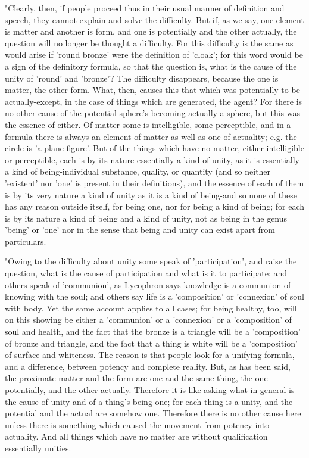 "Clearly, then, if people proceed thus in their usual manner of definition
and speech, they cannot explain and solve the difficulty. But if,
as we say, one element is matter and another is form, and one is potentially
and the other actually, the question will no longer be thought a difficulty.
For this difficulty is the same as would arise if 'round bronze' were
the definition of 'cloak'; for this word would be a sign of the definitory
formula, so that the question is, what is the cause of the unity of
'round' and 'bronze'? The difficulty disappears, because the one is
matter, the other form. What, then, causes this-that which was potentially
to be actually-except, in the case of things which are generated,
the agent? For there is no other cause of the potential sphere's becoming
actually a sphere, but this was the essence of either. Of matter some
is intelligible, some perceptible, and in a formula there is always
an element of matter as well as one of actuality; e.g. the circle
is 'a plane figure'. But of the things which have no matter, either
intelligible or perceptible, each is by its nature essentially a kind
of unity, as it is essentially a kind of being-individual substance,
quality, or quantity (and so neither 'existent' nor 'one' is present
in their definitions), and the essence of each of them is by its very
nature a kind of unity as it is a kind of being-and so none of these
has any reason outside itself, for being one, nor for being a kind
of being; for each is by its nature a kind of being and a kind of
unity, not as being in the genus 'being' or 'one' nor in the sense
that being and unity can exist apart from particulars. 

"Owing to the difficulty about unity some speak of 'participation',
and raise the question, what is the cause of participation and what
is it to participate; and others speak of 'communion', as Lycophron
says knowledge is a communion of knowing with the soul; and others
say life is a 'composition' or 'connexion' of soul with body. Yet
the same account applies to all cases; for being healthy, too, will
on this showing be either a 'communion' or a 'connexion' or a 'composition'
of soul and health, and the fact that the bronze is a triangle will
be a 'composition' of bronze and triangle, and the fact that a thing
is white will be a 'composition' of surface and whiteness. The reason
is that people look for a unifying formula, and a difference, between
potency and complete reality. But, as has been said, the proximate
matter and the form are one and the same thing, the one potentially,
and the other actually. Therefore it is like asking what in general
is the cause of unity and of a thing's being one; for each thing is
a unity, and the potential and the actual are somehow one. Therefore
there is no other cause here unless there is something which caused
the movement from potency into actuality. And all things which have
no matter are without qualification essentially unities.

